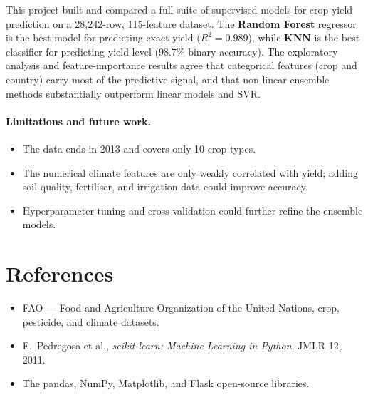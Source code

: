 \documentclass[11pt,a4paper]{article}
\begin{document}
This project built and compared a full suite of supervised models for crop yield
prediction on a 28{,}242-row, 115-feature dataset. The \textbf{Random Forest}
regressor is the best model for predicting exact yield ($R^2 = 0.989$), while
\textbf{KNN} is the best classifier for predicting yield level (98.7\% binary
accuracy). The exploratory analysis and feature-importance results agree that
categorical features (crop and country) carry most of the predictive signal,
and that non-linear ensemble methods substantially outperform linear models and
SVR.

\paragraph{Limitations and future work.}
\begin{itemize}[noitemsep]
  \item The data ends in 2013 and covers only 10 crop types.
  \item The numerical climate features are only weakly correlated with yield;
        adding soil quality, fertiliser, and irrigation data could improve
        accuracy.
  \item Hyperparameter tuning and cross-validation could further refine the
        ensemble models.
\end{itemize}

\section*{References}
\begin{itemize}[noitemsep]
  \item FAO --- Food and Agriculture Organization of the United Nations,
        crop, pesticide, and climate datasets.
  \item F.\ Pedregosa et al., \emph{scikit-learn: Machine Learning in Python},
        JMLR 12, 2011.
  \item The pandas, NumPy, Matplotlib, and Flask open-source libraries.
\end{itemize}
\end{document}
